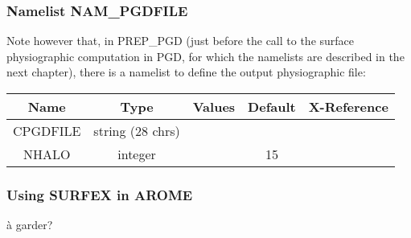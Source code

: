\subsubsection{Namelist NAM\_PGDFILE}

Note however that, in PREP\_PGD (just before the call to the surface physiographic computation in PGD, for which the namelists are described in the next chapter), there is a namelist to define the output physiographic file:

\begin{tabular}{|c|c|c|c|c|}
\hline
Name                     &   Type              & Values &  Default  &  X-Reference    \\
\hline
CPGDFILE                 & string (28 chrs)    &        &           & \\
\hline
NHALO                    & integer             &        &  15       & \\
\hline
\end{tabular}

\subsubsection{Using SURFEX in AROME}
à garder?
